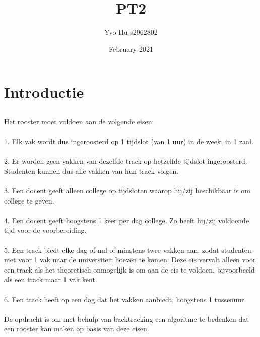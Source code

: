 \documentclass{article}
\title{PT2}
\author{Yvo Hu s2962802 }
\date{February 2021}
\begin{document}
\maketitle

\section{Introductie}
\subsection{}
Het rooster moet voldoen aan de volgende eisen:\\ \\
1. Elk vak wordt dus ingeroosterd op 1 tijdslot (van 1 uur) in de week, in 1 zaal.\\ \\
2. Er worden geen vakken van dezelfde track op hetzelfde tijdslot ingeroosterd. Studenten
kunnen dus alle vakken van hun track volgen.\\ \\
3.  Een docent geeft alleen college op tijdsloten waarop hij/zij beschikbaar is om college te
geven.\\ \\
4. Een docent geeft hoogstens 1 keer per dag college. Zo heeft hij/zij voldoende tijd voor
de voorbereiding.\\ \\
5. Een track biedt elke dag of nul of minstens twee vakken aan, zodat studenten niet voor
1 vak naar de universiteit hoeven te komen. Deze eis vervalt alleen voor een track als het theoretisch
onmogelijk is om aan de eis te voldoen, bijvoorbeeld als een track maar 1 vak kent.\\ \\
6.  Een track heeft op een dag dat het vakken aanbiedt, hoogstens 1 tussenuur.\\ \\
De opdracht is om met behulp van backtracking een algoritme te bedenken dat een rooster kan maken op basis van deze eisen.
 
 \newpage
\end{document}
